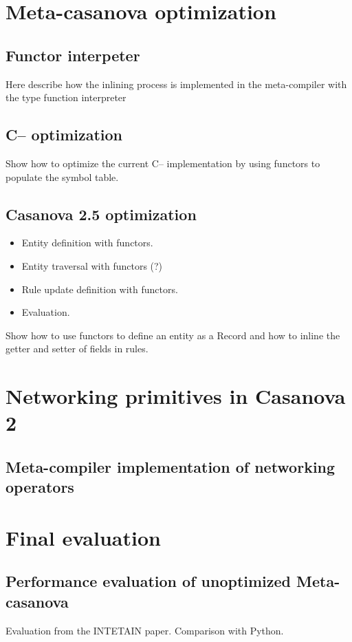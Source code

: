 \documentclass[8pt,a5paper]{extbook}
\begin{document}
\chapter{Meta-casanova optimization}


\section{Functor interpeter}
Here describe how the inlining process is implemented in the meta-compiler with the type function interpreter

\section{C-- optimization}
Show how to optimize the current C-- implementation by using functors to populate the symbol table.

\section{Casanova 2.5 optimization}
\begin{itemize}[noitemsep]
	\item Entity definition with functors.
	\item Entity traversal with functors (?)
	\item Rule update definition with functors.
	\item Evaluation.
\end{itemize}
Show how to use functors to define an entity as a Record and how to inline the getter and setter of fields in rules.
	
\chapter{Networking primitives in Casanova 2}


\section{Meta-compiler implementation of networking operators}
	
\chapter{Final evaluation}
\section{Performance evaluation of unoptimized Meta-casanova}
	Evaluation from the INTETAIN paper. Comparison with Python. 
\end{document}
